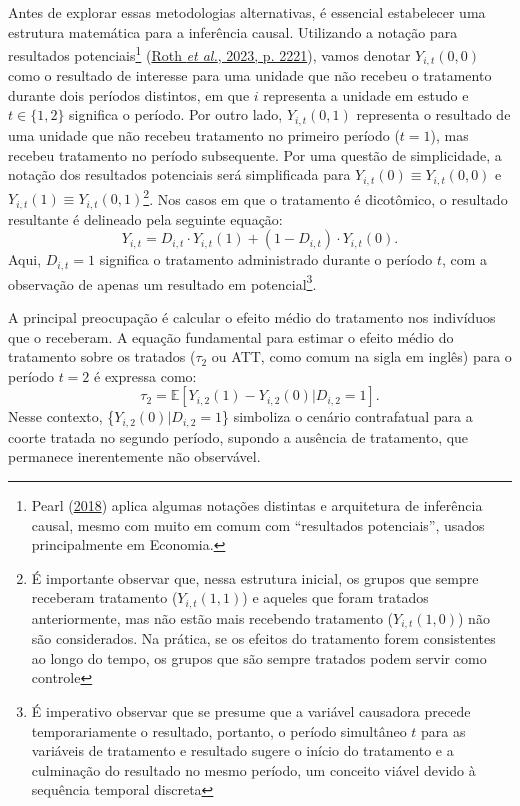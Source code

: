 \documentclass[12pt, a4paper, twoside]{article}
\numberwithin{equation}{subsection} %
\begin{document}
Antes de explorar essas metodologias alternativas, é essencial
estabelecer uma estrutura matemática para a inferência causal.
Utilizando a notação para resultados potenciais\footnote{Pearl
  (\protect\hyperlink{ref-pearl2018}{2018}) aplica algumas notações
  distintas e arquitetura de inferência causal, mesmo com muito em comum
  com ``resultados potenciais'', usados principalmente em Economia.}
(\protect\hyperlink{ref-roth_whats_2023}{Roth \emph{et al.}, 2023, p.
2221}), vamos denotar \(Y_{i,t}(0, 0)\) como o resultado de interesse
para uma unidade que não recebeu o tratamento durante dois períodos
distintos, em que \(i\) representa a unidade em estudo e
\(t \in \{1,2\}\) significa o período. Por outro lado, \(Y_{i,t}(0, 1)\)
representa o resultado de uma unidade que não recebeu tratamento no
primeiro período (\(t = 1\)), mas recebeu tratamento no período
subsequente. Por uma questão de simplicidade, a notação dos resultados
potenciais será simplificada para \(Y_{i,t}(0) \equiv Y_{i,t}(0, 0)\) e
\(Y_{i,t}(1) \equiv Y_{i,t}(0, 1)\)\footnote{É importante observar que,
  nessa estrutura inicial, os grupos que sempre receberam tratamento
  (\(Y_{i,t}(1, 1)\)) e aqueles que foram tratados anteriormente, mas
  não estão mais recebendo tratamento (\(Y_{i,t}(1, 0)\)) não são
  considerados. Na prática, se os efeitos do tratamento forem
  consistentes ao longo do tempo, os grupos que são sempre tratados
  podem servir como controle}. Nos casos em que o tratamento é
dicotômico, o resultado resultante é delineado pela seguinte equação:
\begin{equation} \label{eq-outcome-variable}
Y_{i,t} = D_{i,t} \cdot Y_{i,t}(1) + (1 - D_{i,t}) \cdot Y_{i,t}(0).
\end{equation} Aqui, \(D_{i,t} = 1\) significa o tratamento administrado
durante o período \(t\), com a observação de apenas um resultado em
potencial\footnote{É imperativo observar que se presume que a variável
  causadora precede temporariamente o resultado, portanto, o período
  simultâneo \(t\) para as variáveis de tratamento e resultado sugere o
  início do tratamento e a culminação do resultado no mesmo período, um
  conceito viável devido à sequência temporal discreta}.

A principal preocupação é calcular o efeito médio do tratamento nos
indivíduos que o receberam. A equação fundamental para estimar o efeito
médio do tratamento sobre os tratados (\(\tau_2\) ou ATT, como comum na
sigla em inglês) para o período \(t=2\) é expressa como:
\begin{equation} 
\label{eq-counterfactual}
   \tau_2 = \mathbb{E}[Y_{i,2}(1) - Y_{i,2}(0) | D_{i,2} = 1].
\end{equation} Nesse contexto, \{\(Y_{i,2}(0) | D_{i,2} = 1\)\}
simboliza o cenário contrafatual para a coorte tratada no segundo
período, supondo a ausência de tratamento, que permanece inerentemente
não observável.
\end{document}
